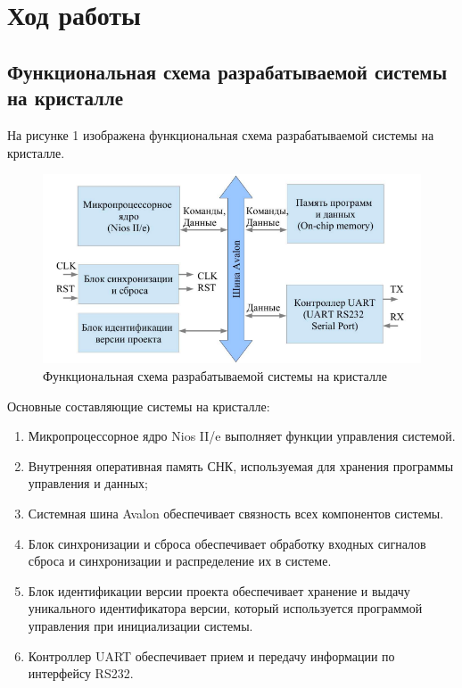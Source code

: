 \chapter*{Ход работы}

\section*{Функциональная схема разрабатываемой системы на кристалле}
На рисунке 1 изображена функциональная схема разрабатываемой системы на кристалле.

\FloatBarrier
\begin{figure}[h]
	\begin{center}
		\includegraphics[width=\linewidth]{inc/func.png}
	\end{center}
	\caption{Функциональная схема разрабатываемой системы на кристалле}
\end{figure}
\FloatBarrier

Основные составляющие системы на кристалле:
\begin{enumerate}
	\item Микропроцессорное ядро Nios II/e выполняет функции управления системой.
	\item Внутренняя оперативная память СНК, используемая для хранения программы управления и данных;
	\item Системная шина Avalon обеспечивает связность всех компонентов системы.
	\item Блок синхронизации и сброса обеспечивает обработку входных сигналов сброса и синхронизации и распределение их в системе.
	\item Блок идентификации версии проекта обеспечивает хранение и выдачу уникального
	идентификатора версии, который используется программой управления при
	инициализации системы.
	\item Контроллер UART обеспечивает прием и передачу информации по интерфейсу RS232.
\end{enumerate}

